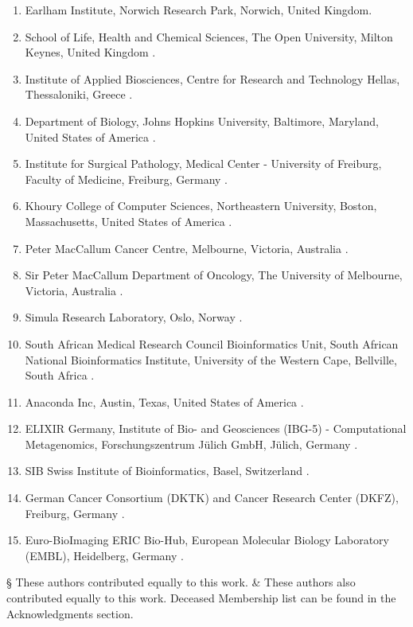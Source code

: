 \begin{enumerate}
\item Earlham Institute, Norwich Research Park, Norwich, United Kingdom.\label{gtn-affil:16}
\item School of Life, Health and Chemical Sciences, The Open University, Milton Keynes, United Kingdom .\label{gtn-affil:17}
\item Institute of Applied Biosciences, Centre for Research and Technology Hellas, Thessaloniki, Greece .\label{gtn-affil:18}
\item Department of Biology, Johns Hopkins University, Baltimore, Maryland, United States of America .\label{gtn-affil:19}
\item Institute for Surgical Pathology, Medical Center - University of Freiburg, Faculty of Medicine, Freiburg, Germany .\label{gtn-affil:20}
\item Khoury College of Computer Sciences, Northeastern University, Boston, Massachusetts, United States of America .\label{gtn-affil:21}
\item Peter MacCallum Cancer Centre, Melbourne, Victoria, Australia .\label{gtn-affil:22}
\item Sir Peter MacCallum Department of Oncology, The University of Melbourne, Victoria, Australia .\label{gtn-affil:23}
\item Simula Research Laboratory, Oslo, Norway .\label{gtn-affil:24}
\item South African Medical Research Council Bioinformatics Unit, South African National Bioinformatics Institute, University of the Western Cape, Bellville, South Africa .\label{gtn-affil:25}
\item Anaconda Inc, Austin, Texas, United States of America .\label{gtn-affil:26}
\item ELIXIR Germany, Institute of Bio- and Geosciences (IBG-5) - Computational Metagenomics, Forschungszentrum Jülich GmbH, Jülich, Germany .\label{gtn-affil:27}
\item SIB Swiss Institute of Bioinformatics, Basel, Switzerland .\label{gtn-affil:28}
\item German Cancer Consortium (DKTK) and Cancer Research Center (DKFZ), Freiburg, Germany .\label{gtn-affil:29}
\item Euro-BioImaging ERIC Bio-Hub, European Molecular Biology Laboratory (EMBL), Heidelberg, Germany .\label{gtn-affil:30}
\end{enumerate}


§ These authors contributed equally to this work.
\& These authors also contributed equally to this work.
\dag Deceased
\textpilcrow Membership list can be found in the Acknowledgments section.
\normalsize


